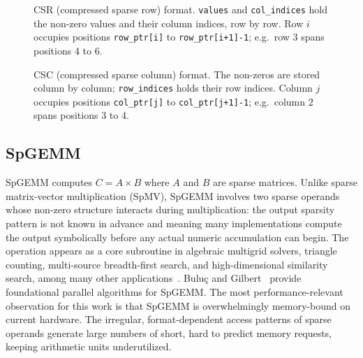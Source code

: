 \begin{figure}[htbp]
  \centering
  \caption{CSR (compressed sparse row) format. \texttt{values} and
  \texttt{col\_indices} hold the non-zero values and their column indices, row by
  row. Row $i$ occupies positions \texttt{row\_ptr[i]} to
  \texttt{row\_ptr[i+1]-1}; e.g.\ row 3 spans positions 4 to 6.}
  \label{fig:csr}
\end{figure}

\begin{figure}[htbp]
  \centering
  \caption{CSC (compressed sparse column) format. The non-zeros are stored
  column by column; \texttt{row\_indices} holds their row indices. Column $j$
  occupies positions \texttt{col\_ptr[j]} to \texttt{col\_ptr[j+1]-1}; e.g.\
  column 2 spans positions 3 to 4.}
  \label{fig:csc}
\end{figure}

\subsection{SpGEMM}
SpGEMM computes $C = A \times B$ where $A$ and $B$ are sparse matrices. Unlike sparse
matrix-vector multiplication (SpMV), SpGEMM involves two sparse operands whose
non-zero structure interacts during multiplication: the output sparsity pattern is not
known in advance and meaning many implementations compute the output symbolically before any actual numeric accumulation can
begin. The operation appears as a core subroutine in algebraic multigrid solvers,
triangle counting, multi-source breadth-first search, and high-dimensional similarity
search, among many other applications~\cite{spgemm_survey}.
Buluç and Gilbert~\cite{buluc_gilbert}
provide foundational parallel algorithms for SpGEMM.
The most performance-relevant observation for this work is that SpGEMM is overwhelmingly
memory-bound on current hardware. The irregular, format-dependent access patterns of
sparse operands generate large numbers of short, hard to predict memory requests, keeping
arithmetic units underutilized.

